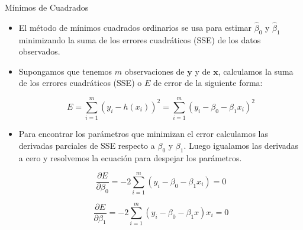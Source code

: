 \documentclass[handout]{beamer}
\begin{document}
\begin{frame}{Mínimos de Cuadrados}
\scriptsize{
\begin{itemize}

 \item El método de mínimos cuadrados ordinarios  se usa para estimar $\hat{\beta}_{0}$ y $\hat{\beta}_{1}$ minimizando la suma de los errores cuadráticos (SSE) de los datos observados.

 \item Supongamos que tenemos $m$ observaciones de $\mathbf{y}$ y de $\mathbf{x}$,  calculamos la suma de los errores cuadráticos (SSE) o $E$ de error de la siguiente forma:

\begin{equation}
E = \sum_{i=1}^{m} (y_i-h(x_i))^2 =  \sum_{i=1}^{m} (y_i-\beta_{0}-\beta_{1}x_i)^2
\end{equation}

 \item Para encontrar los parámetros que minimizan el error calculamos las derivadas parciales de SSE respecto a $\beta_{0}$ y $\beta_{1}$. Luego igualamos las derivadas a cero y resolvemos la ecuación para despejar los parámetros.
 
 \begin{equation}
 \frac{\partial E}{ \partial \beta_0} = -2\sum_{i=1}^{m}(y_i-\beta_{0}-\beta_{1}x_i)=0
 \end{equation}

  \begin{equation}
 \frac{\partial E}{ \partial \beta_1} = -2\sum_{i=1}^{m}(y_i-\beta_{0}-\beta_{1}x)x_i=0
 \end{equation}



\end{itemize}



} 
\end{frame}
\end{document}
